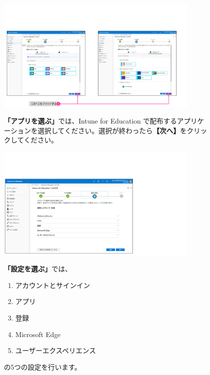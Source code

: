 \begin{figure}[h]
    \begin{minipage}{0.6\textwidth}
        \vspace{-1cm}
        \includegraphics[width=10cm]{figures/Setup-Intune-06.png}
    \end{minipage}
    \begin{minipage}{0.4\textwidth}
        \textbf{「アプリを選ぶ」}では、Intune for Education で配布するアプリケーションを選択してください。選択が終わったら\textbf{【次へ】}をクリックしてください。
    \end{minipage}
\end{figure}

\begin{figure}[h]
    \begin{minipage}{0.6\textwidth}
        \vspace{-1cm}
        \includegraphics[width=10cm]{figures/Setup-Intune-07.png}
    \end{minipage}
    \begin{minipage}{0.4\textwidth}
        \textbf{「設定を選ぶ」}では、
        \begin{enumerate}
            \item アカウントとサインイン
            \item アプリ
            \item 登録
            \item Microsoft Edge
            \item ユーザーエクスペリエンス
        \end{enumerate}
        の5つの設定を行います。
    \end{minipage}
\end{figure}


